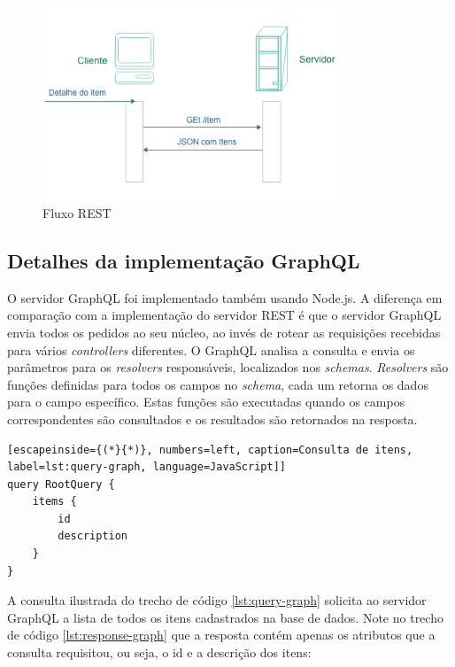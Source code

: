 \begin{figure}[htbp]
\centering
\includegraphics[width=0.8\textwidth]{figuras/uml-rest.png}
\caption{Fluxo REST}
\label{fig:rest-uml}
\author{fonte: Autor}
\end{figure}

\subsection{Detalhes da implementação GraphQL}

O servidor GraphQL foi implementado também usando Node.js. A diferença em comparação com a implementação do servidor REST é que o servidor GraphQL envia todos os pedidos ao seu núcleo, ao invés de rotear as requisições recebidas para vários \textit{controllers} diferentes. O GraphQL analisa a consulta e envia os parâmetros para os \textit{resolvers} responsáveis, localizados nos \textit{schemas}. \textit{Resolvers} são funções definidas para todos os campos no \textit{schema}, cada um retorna os dados para o campo específico. Estas funções são executadas quando os campos correspondentes são consultados e os resultados são retornados na resposta.

\begin{lstlisting}[escapeinside={(*}{*)}, numbers=left, caption=Consulta de itens, label=lst:query-graph, language=JavaScript]]
query RootQuery {
	items {
    	id
    	description
    }
}

\end{lstlisting}

 A consulta ilustrada do trecho de código \ref{lst:query-graph} solicita ao servidor GraphQL a lista de todos os itens cadastrados na base de dados. Note no trecho de código \ref{lst:response-graph} que a resposta contém apenas os atributos que a consulta requisitou, ou seja, o \textup{id} e a descrição dos itens:

